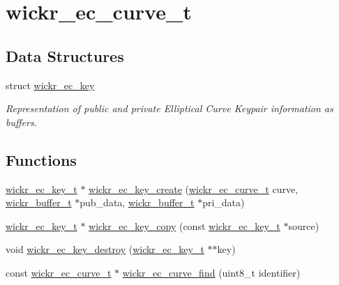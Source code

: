 \hypertarget{group__wickr__ec__curve}{}\section{wickr\+\_\+ec\+\_\+curve\+\_\+t}
\label{group__wickr__ec__curve}
\subsection*{Data Structures}
\begin{DoxyCompactItemize}
\item 
struct \hyperlink{structwickr__ec__key}{wickr\+\_\+ec\+\_\+key}
\begin{DoxyCompactList}\small\item\em Representation of public and private Elliptical Curve Keypair information as buffers. \end{DoxyCompactList}\end{DoxyCompactItemize}
\subsection*{Functions}
\begin{DoxyCompactItemize}
\item 
\hyperlink{structwickr__ec__key}{wickr\+\_\+ec\+\_\+key\+\_\+t} $\ast$ \hyperlink{group__wickr__ec__curve_ga912f46bc12a39f57d8d1b87a639f7cdf}{wickr\+\_\+ec\+\_\+key\+\_\+create} (\hyperlink{structwickr__ec__curve}{wickr\+\_\+ec\+\_\+curve\+\_\+t} curve, \hyperlink{structwickr__buffer}{wickr\+\_\+buffer\+\_\+t} $\ast$pub\+\_\+data, \hyperlink{structwickr__buffer}{wickr\+\_\+buffer\+\_\+t} $\ast$pri\+\_\+data)
\item 
\hyperlink{structwickr__ec__key}{wickr\+\_\+ec\+\_\+key\+\_\+t} $\ast$ \hyperlink{group__wickr__ec__curve_gaf12eff11d78b2ce9ff32710406d58d4f}{wickr\+\_\+ec\+\_\+key\+\_\+copy} (const \hyperlink{structwickr__ec__key}{wickr\+\_\+ec\+\_\+key\+\_\+t} $\ast$source)
\item 
void \hyperlink{group__wickr__ec__curve_gac18ac86b270f540bf5a55ad271ab0568}{wickr\+\_\+ec\+\_\+key\+\_\+destroy} (\hyperlink{structwickr__ec__key}{wickr\+\_\+ec\+\_\+key\+\_\+t} $\ast$$\ast$key)
\item 
const \hyperlink{structwickr__ec__curve}{wickr\+\_\+ec\+\_\+curve\+\_\+t} $\ast$ \hyperlink{group__wickr__ec__curve_ga35d0968431b69993b7a6e3351d503d72}{wickr\+\_\+ec\+\_\+curve\+\_\+find} (uint8\+\_\+t identifier)
\end{DoxyCompactItemize}


